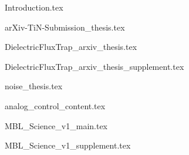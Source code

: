 





\begin{frontmatter}










\cleardoublepage
{}
\begin{singlespace}
\tableofcontents
\end{singlespace}

\end{frontmatter}

\pagestyle{plain} %

%
{Introduction.tex}

{arXiv-TiN-Submission_thesis.tex}

{DielectricFluxTrap_arxiv_thesis.tex}

{DielectricFluxTrap_arxiv_thesis_supplement.tex}

{noise_thesis.tex}

{analog_control_content.tex}


{MBL_Science_v1_main.tex}

{MBL_Science_v1_supplement.tex}





%
%
\printbibliography


